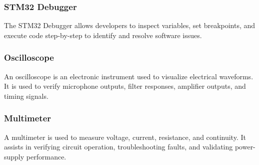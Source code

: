 \subsubsection{STM32 Debugger}

The STM32 Debugger allows developers to inspect variables, set breakpoints, and execute code step-by-step to identify and resolve software issues.

\subsubsection{Oscilloscope}

An oscilloscope is an electronic instrument used to visualize electrical waveforms. It is used to verify microphone outputs, filter responses, amplifier outputs, and timing signals.

\subsubsection{Multimeter}

A multimeter is used to measure voltage, current, resistance, and continuity. It assists in verifying circuit operation, troubleshooting faults, and validating power-supply performance.





